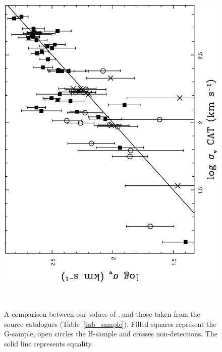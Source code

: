 \documentclass[usenatbib]{mn2e}
\begin{document}
\begin{figure}
\begin{minipage}{241pt}
  \end{minipage}\hspace{18pt}
  \begin{minipage}{241pt}

    \includegraphics[height=\linewidth,angle=270]{fig_07.ps}
    \caption{A comparison between our values of \sigmav, and those taken from the
             source catalogues (Table~\ref{tab_sample}).  Filled squares
             represent the G-sample, open circles the H-sample and crosses
             non-detections.  The solid line represents equality.}
    \label{fig_sigma_sigmacat}

  \end{minipage}\\
  \begin{minipage}{241pt} 


\end{minipage}
\end{figure}
\end{document}
